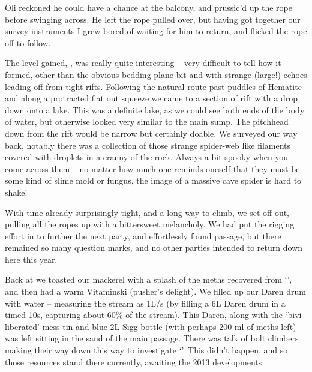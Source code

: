 
Oli reckoned he could have a chance at the balcony, and prussic'd up the
rope before swinging across. He left the rope pulled over, but having
got together our survey instruments I grew bored of waiting for him to
return, and flicked the rope off to follow.

The level gained, , was really quite interesting -- very
difficult to tell how it formed, other than the obvious bedding plane
bit and with strange (large!) echoes leading off from tight rifts.
Following the natural route past puddles of Hematite and along a
protracted flat out squeeze we came to a section of rift with a drop
down onto a lake. This was a definite lake, as we could see both ends of
the body of water, but otherwise looked very similar to the main sump.
The pitchhead down from the rift would be narrow but certainly doable.
We surveyed our way back, notably there was a collection of those
strange spider-web like filaments covered with droplets in a cranny of
the rock. Always a bit spooky when you come across them -- no matter how
much one reminds oneself that they must be some kind of slime mold or
fungus, the image of a massive cave spider is hard to shake!


With time already surprisingly tight, and a long way to climb, we set
off out, pulling all the ropes up with a bittersweet melancholy. We had
put the rigging effort in to further the next party, and effortlessly
found passage, but there remained so many question marks, and no other
parties intended to return down here this year.

Back at  we toasted our mackerel with a splash of the meths
recovered from `', and then had a warm Vitaminski (pusher's
delight). We filled up our Daren drum with water -- measuring the  stream as 1L/s (by filling a 6L Daren drum in a timed 10s, capturing
about 60\% of the stream). This Daren, along with the `bivi liberated'
mess tin and blue 2L Sigg bottle (with perhaps 200 ml of meths left) was
left sitting in the sand of the main  passage. There was talk of
bolt climbers making their way down this way to investigate `'. This didn't happen, and so those resources stand there
currently, awaiting the 2013 developments.

